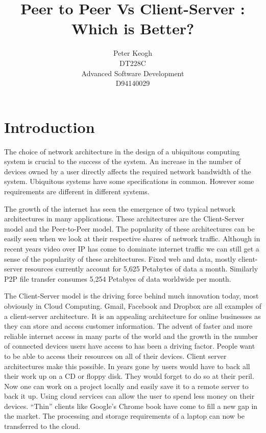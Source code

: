 \documentclass[11pt]{amsart}
\title{Peer to Peer Vs Client-Server : Which is Better?}
\author{
Peter Keogh
\\DT228C
\\Advanced Software Development
\\D94140029
}
\date{}
\begin{document}
\maketitle
\tableofcontents

\part{Introduction}

The choice of network architecture in the design of a ubiquitous computing system is crucial to the success of the system. An increase in the number of devices owned by a user directly affects the required network bandwidth of the system. Ubiquitous systems have some specifications in common. However some requirements are different in different systems.

\indent The growth of the internet has seen the emergence of two typical network architectures in many applications. These architectures are the Client-Server model and the Peer-to-Peer model. 
\indent The popularity of these architectures can be easily seen when we look at their respective shares of network traffic. Although in recent years video over IP has come to dominate internet traffic we can still get a sense of the popularity of these architectures.  
Fixed web and data, mostly client-server resources currently account for 5,625 Petabytes of data a month. Similarly P2P file transfer consumes 5,254 Petabyes of data worldwide per month.\cite{Cisco}

The Client-Server model is the driving force behind much innovation today, most obviously in Cloud Computing. Gmail, Facebook and Dropbox are all examples of a client-server architecture. It is an appealing architecture for online businesses as they can store and access customer information. The advent of faster and more reliable internet access in many parts of the world and the growth in the number of connected devices users have access to has been a driving factor. People want to be able to access their resources on all of their devices. Client server architectures make this possible. In years gone by users would have to back all their work up on a CD or floppy disk. They would forget to do so at their peril. Now one can work on a project locally and easily save it to a remote server to back it up. 
Using cloud services can allow the user to spend less money on their devices. ``Thin'' clients like Google's Chrome book have come to fill a new gap in the market. The processing and storage requirements of a laptop can now be transferred to the cloud.
\end{document}
